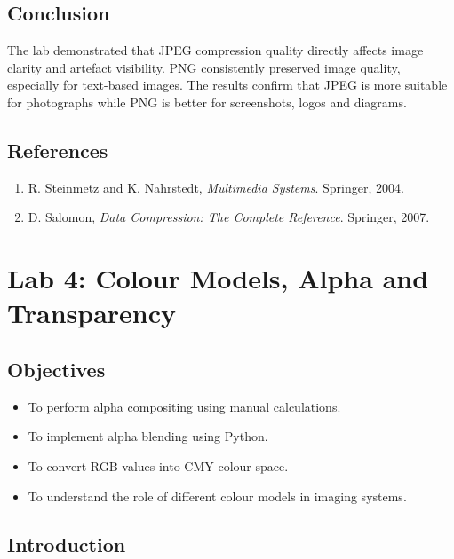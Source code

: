 \documentclass[12pt,a4paper]{article}
\begin{document}
\subsection{Conclusion}

The lab demonstrated that JPEG compression quality directly affects image clarity and artefact visibility. PNG consistently preserved image quality, especially for text-based images. The results confirm that JPEG is more suitable for photographs while PNG is better for screenshots, logos and diagrams.

\subsection{References}

\begin{enumerate}
    \item R. Steinmetz and K. Nahrstedt, \textit{Multimedia Systems}. Springer, 2004.
    \item D. Salomon, \textit{Data Compression: The Complete Reference}. Springer, 2007.
\end{enumerate}
\newpage

\section{Lab 4: Colour Models, Alpha and Transparency}

\subsection{Objectives}

\begin{itemize}
    \item To perform alpha compositing using manual calculations.
    \item To implement alpha blending using Python.
    \item To convert RGB values into CMY colour space.
    \item To understand the role of different colour models in imaging systems.
\end{itemize}

\subsection{Introduction}
\end{document}
